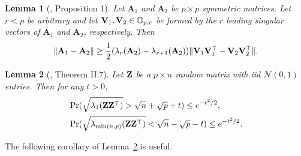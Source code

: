 \documentclass[times,sort&compress,3p]{elsarticle}
\newcommand{\BA}{\mathbf{A}}    \newcommand{\BB}{\mathbf{B}}    \newcommand{\BC}{\mathbf{C}}    \newcommand{\BD}{\mathbf{D}}    \newcommand{\BE}{\mathbf{E}}    \newcommand{\BF}{\mathbf{F}}    \newcommand{\BG}{\mathbf{G}}    \newcommand{\BH}{\mathbf{H}}    \newcommand{\BI}{\mathbf{I}}    \newcommand{\BJ}{\mathbf{J}}    \newcommand{\BK}{\mathbf{K}}    \newcommand{\BL}{\mathbf{L}}
\theoremstyle{plain}
\newtheorem{corollary}{\quad\quad Corollary}
\newtheorem{lemma}{\quad\quad Lemma}
\theoremstyle{definition}
\theoremstyle{remark}
\begin{document}
\begin{appendices}
\begin{lemma}[\cite{Cai2015Optimal}, Proposition 1]\label{pert}
    Let $\BA_1$ and $\BA_2$ be $p\times p$ symmetric matrices. Let $r<p$ be arbitrary and let $\mathbf{V}_1, \mathbf{V}_2\in \mathbb{O}_{p,r}$ be formed by the $r$ leading singular vectors of $\BA_1$ and $\BA_2$, respectively.
    Then
    $$
    \|\BA_1-\BA_2\|\geq \frac{1}{2}(\lambda_r(\BA_2)-\lambda_{r+1}(\BA_2))\|\BV_1 \BV_1^\top - \BV_2 \BV_2^\top \|.
    $$
\end{lemma}


\begin{lemma}[\cite{DAVIDSON2001317}, Theorem II.7]\label{DSbound}
    Let $\mathbf{Z}$ be a $p\times n$ random matrix with iid $\mathcal{N}(0,1)$ entries.
    Then for any $t>0$,
    \begin{align*}
        &\Pr(\sqrt{\lambda_1(\mathbf{Z} \mathbf{Z}^\top  )}>\sqrt{n}+\sqrt{p}+t)\leq e^{-t^2/2},
        \\
        &\Pr(\sqrt{\lambda_{\min(n,p)}(\mathbf{Z} \mathbf{Z}^\top  )}<\sqrt{n}-\sqrt{p}-t)\leq e^{-t^2/2}.
    \end{align*}
\end{lemma}
    The following corollary of Lemma~\ref{DSbound} is useful.


\end{appendices}
\end{document}
